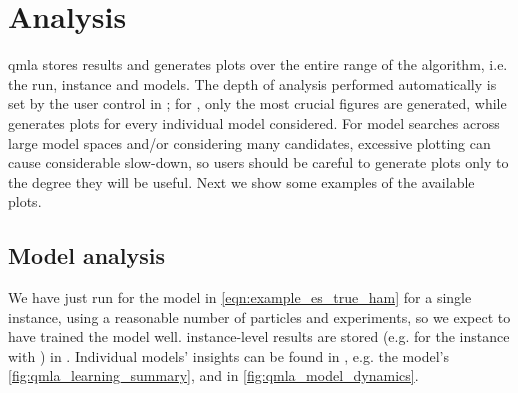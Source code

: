\section{Analysis}
\gls{qmla} stores results and generates plots
    over the entire range of the algorithm\footnotemark, i.e. the \gls{run}, \gls{instance} and models. 
The depth of analysis performed automatically is set by the user control  in ;
    for , only the most crucial figures are generated, while  generates plots for every individual 
    model considered. 
For model searches across large model spaces and/or considering many candidates,
    excessive plotting can cause considerable slow-down, so users should be careful to generate plots only 
    to the degree they will be useful. 
Next we show some examples of the available plots. 
\par 

\subsection{Model analysis}

We have just run  for the model in \cref{eqn:example_es_true_ham} for a single instance, 
    using a reasonable number of particles and experiments, so we expect to have trained the model well. 
\Gls{instance}-level results are stored (e.g. for the instance with ) in .
Individual models' insights can be found in , 
    e.g. the model's  \cref{fig:qmla_learning_summary}, and  in \cref{fig:qmla_model_dynamics}.
\par 

